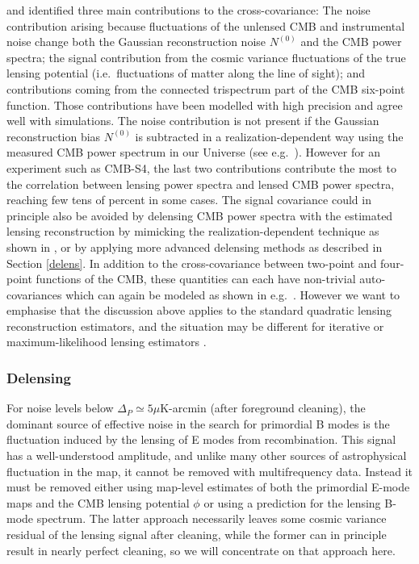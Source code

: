 \cite{Schmittfull:2013uea} and \cite{Peloton:prep} identified three main contributions to the cross-covariance: The noise contribution arising because fluctuations of the unlensed CMB and instrumental noise change both the Gaussian reconstruction noise $N^{(0)}$ and the CMB power spectra;
the signal contribution from the cosmic variance fluctuations of the true lensing potential (i.e.~fluctuations of matter along the line of sight); and contributions coming from the connected trispectrum part of the CMB six-point function.
Those contributions have been modelled with high precision and agree well with simulations.
The noise contribution is not present if the Gaussian reconstruction bias $N^{(0)}$ is subtracted in a realization-dependent way using the measured CMB power spectrum in our Universe (see e.g.~\cite{Hanson:2010rp,Schmittfull:2013uea}).
However for an experiment such as CMB-S4, the last two contributions contribute the most to the correlation between lensing power spectra and lensed CMB power spectra, reaching few tens of percent in some cases.
The signal covariance could in principle also be avoided by delensing CMB power spectra with the estimated lensing reconstruction by mimicking the realization-dependent technique as shown in \cite{Schmittfull:2013uea}, or by applying more advanced delensing methods as described in Section \ref{delens}.
In addition to the cross-covariance between two-point and four-point functions of the CMB, these quantities can each have non-trivial auto-covariances which can again be modeled as shown in e.g.~\cite{Smith:2005ue,Smith:2006nk,Li:2006pu,BenoitLevy:2012va,Schmittfull:2013uea,Peloton:prep}. 
However we want to emphasise that the discussion above applies to the standard quadratic lensing reconstruction estimators, and the situation may be different for iterative or maximum-likelihood lensing estimators \cite{Hirata:2002jy}.

\subsubsection{Delensing}
For noise levels below $\Delta_P \simeq 5 \mu$K-arcmin (after foreground cleaning),  the dominant source of effective noise in the search for primordial B modes is the fluctuation induced by the lensing of E modes from recombination.  This signal has a well-understood amplitude, and unlike many other sources of astrophysical fluctuation in the map, it cannot be removed with multifrequency data.  Instead it must be removed either using map-level estimates of both the primordial E-mode maps and the CMB lensing potential $\phi$ or using a prediction for the lensing B-mode spectrum. The latter approach necessarily leaves some cosmic variance residual of the lensing signal after cleaning, while the former can in principle result in nearly perfect cleaning, so we will concentrate on that approach here.

